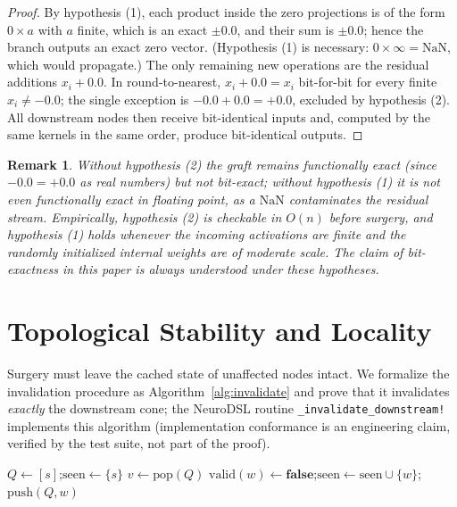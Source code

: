 \documentclass[11pt,a4paper]{article}
\newtheorem{remark}{Remark}
\newcommand{\G}{\mathcal{G}}
\newcommand{\E}{\mathcal{E}}
\begin{document}
\begin{proof}
By hypothesis (1), each product inside the zero projections is of the form $0 \times a$ with $a$ finite, which is an exact $\pm 0.0$, and their sum is $\pm 0.0$; hence the branch outputs an exact zero vector. (Hypothesis (1) is necessary: $0 \times \infty = \mathrm{NaN}$, which would propagate.) The only remaining new operations are the residual additions $x_i + 0.0$. In round-to-nearest, $x_i + 0.0 = x_i$ bit-for-bit for every finite $x_i \neq -0.0$; the single exception is $-0.0 + 0.0 = +0.0$, excluded by hypothesis (2). All downstream nodes then receive bit-identical inputs and, computed by the same kernels in the same order, produce bit-identical outputs.
\end{proof}

\begin{remark}
Without hypothesis (2) the graft remains functionally exact (since $-0.0 = +0.0$ as real numbers) but not bit-exact; without hypothesis (1) it is not even functionally exact in floating point, as a $\mathrm{NaN}$ contaminates the residual stream. Empirically, hypothesis (2) is checkable in $O(n)$ before surgery, and hypothesis (1) holds whenever the incoming activations are finite and the randomly initialized internal weights are of moderate scale. The claim of bit-exactness in this paper is always understood under these hypotheses.
\end{remark}

\section{Topological Stability and Locality}
\label{sec:locality}

Surgery must leave the cached state of unaffected nodes intact. We formalize the invalidation procedure as Algorithm~\ref{alg:invalidate} and prove that it invalidates \emph{exactly} the downstream cone; the NeuroDSL routine \texttt{\_invalidate\_downstream!} implements this algorithm (implementation conformance is an engineering claim, verified by the test suite, not part of the proof).

\begin{algorithm}
\caption{\textsc{Invalidate}$(\G, s)$ --- reactive invalidation from a seed node $s$}
\label{alg:invalidate}
\begin{algorithmic}[1]
\State $Q \gets [s]$;\quad $\mathrm{seen} \gets \{s\}$
    \State $v \gets \mathrm{pop}(Q)$
    \For{each $w$ with $(v, w) \in \E$}
            \State $\mathrm{valid}(w) \gets \mathbf{false}$;\quad $\mathrm{seen} \gets \mathrm{seen} \cup \{w\}$;\quad $\mathrm{push}(Q, w)$
        \EndIf
    \EndFor
\EndWhile
\end{algorithmic}
\end{algorithm}
\end{document}
